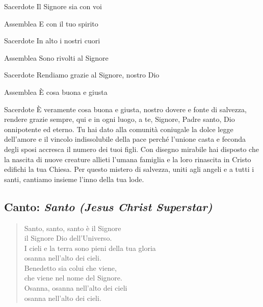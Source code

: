 	\begin{dialoghi}
		\item[Sacerdote] Il Signore sia con voi
		\item[Assemblea] E con il tuo spirito
		\item[Sacerdote] In alto i nostri cuori
		\item[Assemblea] Sono rivolti al Signore
		\item[Sacerdote] Rendiamo grazie al Signore, nostro Dio
		\item[Assemblea] È cosa buona e giusta
		\item[Sacerdote] È veramente cosa buona e giusta, nostro dovere e fonte di salvezza, rendere grazie sempre, qui e in ogni luogo, a te, Signore, Padre santo, Dio onnipotente ed eterno. Tu hai dato alla comunità coniugale la dolce legge dell'amore e il vincolo indissolubile della pace perché l'unione casta e feconda degli sposi accresca il numero dei tuoi figli. Con disegno mirabile hai disposto che la nascita di nuove creature allieti l'umana famiglia e la loro rinascita in Cristo edifichi la tua Chiesa. Per questo mistero di salvezza, uniti agli angeli e a tutti i santi, cantiamo insieme l'inno della tua lode.
	\end{dialoghi}

\subsection*{Canto: \textit{Santo (Jesus Christ Superstar)}}

	\begin{verse}
		\begin{mystrofe}
		Santo, santo, santo è il Signore \\
		il Signore Dio dell'Universo. \\
		I cieli e la terra sono pieni della tua gloria \\
		osanna nell'alto dei cieli. \\
		Benedetto sia colui che viene, \\
		che viene nel nome del Signore. \\
		Osanna, osanna nell'alto dei cieli \\
		osanna nell'alto dei cieli.
		\end{mystrofe}
	\end{verse}

